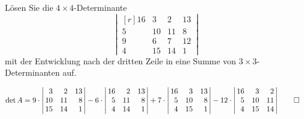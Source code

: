Lösen Sie die $4\times 4$-Determinante
\[
\left|\,\begin{matrix*}[r]
 16 &  3 &  2 & 13 \\
  5 & 10 & 11 &  8 \\
  9 &  6 &  7 & 12 \\
  4 & 15 & 14 &  1
\end{matrix*}\,\right|
\]
mit der Entwicklung nach der dritten Zeile in eine Summe von
$3\times 3$-Determinanten auf.

\begin{loesung}
\begin{align*}
\det A
&=
9\cdot
\left|\,\begin{matrix*}[r]
  3 &  2 & 13 \\
 10 & 11 &  8 \\
 15 & 14 &  1
\end{matrix*}\,\right|
-
6\cdot
\left|\,\begin{matrix*}[r]
 16 &  2 & 13 \\
  5 & 11 &  8 \\
  4 & 14 &  1
\end{matrix*}\,\right|
+
7\cdot
\left|\,\begin{matrix*}[r]
 16 &  3 & 13 \\
  5 & 10 &  8 \\
  4 & 15 &  1
\end{matrix*}\,\right|
-
12\cdot
\left|\,\begin{matrix*}[r]
 16 &  3 &  2 \\
  5 & 10 & 11 \\
  4 & 15 & 14 
\end{matrix*}\,\right|
\qedhere
\end{align*}
\end{loesung}

